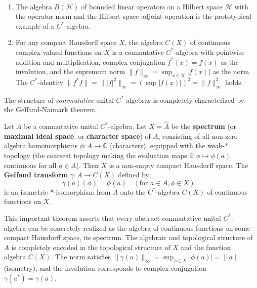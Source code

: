 \begin{example}\,
\begin{enumerate}
    \item The algebra $B(\mathcal{H})$ of bounded linear operators on a Hilbert space $\mathcal{H}$ with the operator norm and the Hilbert space adjoint operation is the prototypical example of a $C^*$-algebra.
    \item For any compact Hausdorff space $X$, the algebra $C(X)$ of continuous complex-valued functions on $X$ is a commutative $C^*$-algebra with pointwise addition and multiplication, complex conjugation $f^*(x) = \overline{f(x)}$ as the involution, and the supremum norm $\|f\|_\infty = \sup_{x \in X} |f(x)|$ as the norm. The $C^*$-identity $\|f^*f\| = \| |f|^2 \|_\infty = (\sup |f(x)|)^2 = \|f\|_\infty^2$ holds.
\end{enumerate}
\end{example}

The structure of \textit{commutative} unital $C^*$-algebras is completely characterized by the Gelfand-Naimark theorem.

\begin{theorem}
\label{thm:gelfand_naimark}
Let $A$ be a commutative unital $C^*$-algebra. Let $X = \hat{A}$ be the \textbf{spectrum} (or \textbf{maximal ideal space}, or \textbf{character space}) of $A$, consisting of all non-zero algebra homomorphisms $\phi: A \to \mathbb{C}$ (characters), equipped with the weak-* topology (the coarsest topology making the evaluation maps $\hat{a}: \phi \mapsto \phi(a)$ continuous for all $a \in A$). Then $X$ is a non-empty compact Hausdorff space.
The \textbf{Gelfand transform} $\gamma: A \to C(X)$ defined by
\[ \gamma(a)(\phi) = \phi(a) \quad (\text{for } a \in A, \phi \in X) \]
is an isometric *-isomorphism from $A$ onto the $C^*$-algebra $C(X)$ of continuous functions on $X$.
\end{theorem}

\begin{remark}[Interpretation]
This important theorem asserts that every abstract commutative unital $C^*$-algebra can be concretely realized as the algebra of continuous functions on some compact Hausdorff space, its spectrum. The algebraic and topological structure of $A$ is completely encoded in the topological structure of $X$ and the function algebra $C(X)$. The norm satisfies $\|\gamma(a)\|_\infty = \sup_{\phi \in X} |\phi(a)| = \|a\|$ (isometry), and the involution corresponds to complex conjugation $\gamma(a^*) = \overline{\gamma(a)}$.
\end{remark}

